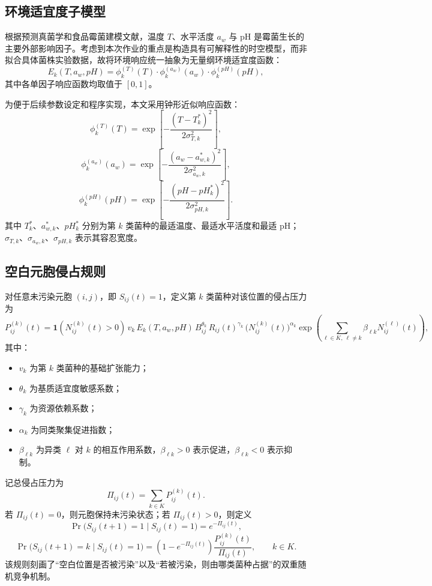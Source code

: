 \documentclass[12pt,a4paper]{ctexart}
\begin{document}
\subsection{环境适宜度子模型}

根据预测真菌学和食品霉菌建模文献，温度 \(T\)、水平活度 \(a_w\) 与 pH 是霉菌生长的主要外部影响因子。考虑到本次作业的重点是构造具有可解释性的时空模型，而非拟合具体菌株实验数据，故将环境响应统一抽象为无量纲环境适宜度函数：
\[
E_k(T,a_w,pH)=\phi_k^{(T)}(T)\cdot \phi_k^{(a_w)}(a_w)\cdot \phi_k^{(pH)}(pH),
\]
其中各单因子响应函数均取值于 \([0,1]\)。

为便于后续参数设定和程序实现，本文采用钟形近似响应函数：
\[
\phi_k^{(T)}(T)=\exp\left[-\frac{(T-T_k^\ast)^2}{2\sigma_{T,k}^2}\right],
\]
\[
\phi_k^{(a_w)}(a_w)=\exp\left[-\frac{(a_w-a_{w,k}^\ast)^2}{2\sigma_{a_w,k}^2}\right],
\]
\[
\phi_k^{(pH)}(pH)=\exp\left[-\frac{(pH-pH_k^\ast)^2}{2\sigma_{pH,k}^2}\right].
\]
其中 \(T_k^\ast\)、\(a_{w,k}^\ast\)、\(pH_k^\ast\) 分别为第 \(k\) 类菌种的最适温度、最适水平活度和最适 pH；\(\sigma_{T,k}\)、\(\sigma_{a_w,k}\)、\(\sigma_{pH,k}\) 表示其容忍宽度。

\subsection{空白元胞侵占规则}

对任意未污染元胞 \((i,j)\)，即 \(S_{ij}(t)=1\)，定义第 \(k\) 类菌种对该位置的侵占压力为
\begin{equation}
P_{ij}^{(k)}(t)=
\mathbf{1}\!\left(N_{ij}^{(k)}(t)>0\right)\,
v_k\,
E_k(T,a_w,pH)\,
B_{ij}^{\theta_k}\,
R_{ij}(t)^{\gamma_k}\,
\bigl(N_{ij}^{(k)}(t)\bigr)^{\alpha_k}
\exp\left(
\sum_{\ell\in K,\ \ell\neq k}\beta_{\ell k}N_{ij}^{(\ell)}(t)
\right),
\label{eq:Pk}
\end{equation}
其中：
\begin{itemize}
    \item \(v_k\) 为第 \(k\) 类菌种的基础扩张能力；
    \item \(\theta_k\) 为基质适宜度敏感系数；
    \item \(\gamma_k\) 为资源依赖系数；
    \item \(\alpha_k\) 为同类聚集促进指数；
    \item \(\beta_{\ell k}\) 为异类 \(\ell\) 对 \(k\) 的相互作用系数，\(\beta_{\ell k}>0\) 表示促进，\(\beta_{\ell k}<0\) 表示抑制。
\end{itemize}

记总侵占压力为
\[
\Pi_{ij}(t)=\sum_{k\in K}P_{ij}^{(k)}(t).
\]
若 \(\Pi_{ij}(t)=0\)，则元胞保持未污染状态；若 \(\Pi_{ij}(t)>0\)，则定义
\[
\Pr\bigl(S_{ij}(t+1)=1\mid S_{ij}(t)=1\bigr)=e^{-\Pi_{ij}(t)},
\]
\[
\Pr\bigl(S_{ij}(t+1)=k\mid S_{ij}(t)=1\bigr)
=
\left(1-e^{-\Pi_{ij}(t)}\right)\frac{P_{ij}^{(k)}(t)}{\Pi_{ij}(t)},\qquad k\in K.
\]
该规则刻画了“空白位置是否被污染”以及“若被污染，则由哪类菌种占据”的双重随机竞争机制。
\end{document}
